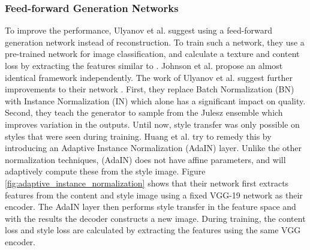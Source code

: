 \documentclass[conference]{IEEEtran}
\begin{document}
\subsubsection{Feed-forward Generation Networks}
To improve the performance, Ulyanov et al. \cite{Ulyanov2016} suggest using a feed-forward generation network instead of reconstruction.
To train such a network, they use a pre-trained network for image classification, and calculate a texture and content loss by extracting the features similar to \cite{Gatys2016}.
Johnson et al. \cite{Johnson2016} propose an almost identical framework independently.
The work of Ulyanov et al. suggest further improvements to their network \cite{Ulyanov2017}.
First, they replace Batch Normalization (BN) \cite{Ioffe2015} with Instance Normalization (IN) which alone has a significant impact on quality.
Second, they teach the generator to sample from the Julesz ensemble \cite{Zhu2000} which improves variation in the outputs.
Until now, style transfer was only possible on styles that were seen during training.
Huang et al. \cite{Huang2017} try to remedy this by introducing an Adaptive Instance Normalization (AdaIN) layer.
Unlike the other normalization techniques, (AdaIN) does not have affine parameters, and will adaptively compute these from the style image.
Figure \ref{fig:adaptive_instance_normalization} shows that their network first extracts features from the content and style image using a fixed VGG-19 network as their encoder.
The AdaIN layer then performs style transfer in the feature space and with the results the decoder constructs a new image.
During training, the content loss and style loss are calculated by extracting the features using the same VGG encoder.

\begin{figure}[h]
	\centering
	\captionsetup{justification=centering}
\end{figure}
\end{document}
